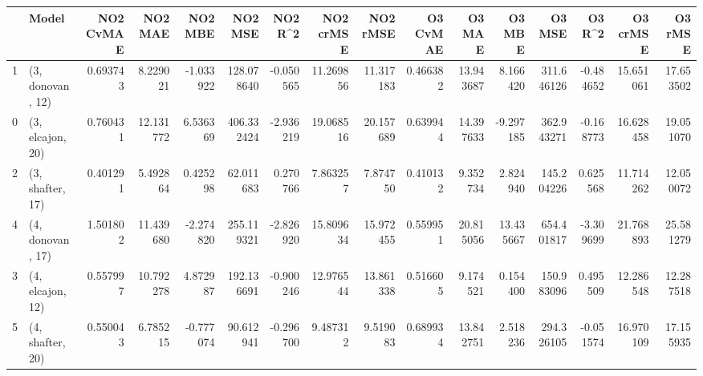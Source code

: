\begin{tabular}{llrrrrrrrrrrrrrr}
\toprule
{} &             Model &  NO2 CvMAE &    NO2 MAE &   NO2 MBE &     NO2 MSE &   NO2 R\textasciicircum2 &  NO2 crMSE &   NO2 rMSE &  O3 CvMAE &     O3 MAE &     O3 MBE &      O3 MSE &    O3 R\textasciicircum2 &   O3 crMSE &    O3 rMSE \\
\midrule
1 &  (3, donovan, 12) &   0.693743 &   8.229021 & -1.033922 &  128.078640 & -0.050565 &  11.269856 &  11.317183 &  0.466382 &  13.943687 &   8.166420 &  311.646126 & -0.484652 &  15.651061 &  17.653502 \\
0 &  (3, elcajon, 20) &   0.760431 &  12.131772 &  6.536369 &  406.332424 & -2.936219 &  19.068516 &  20.157689 &  0.639944 &  14.397633 &  -9.297185 &  362.943271 & -0.168773 &  16.628458 &  19.051070 \\
2 &  (3, shafter, 17) &   0.401291 &   5.492864 &  0.425298 &   62.011683 &  0.270766 &   7.863257 &   7.874750 &  0.410132 &   9.352734 &   2.824940 &  145.204226 &  0.625568 &  11.714262 &  12.050072 \\
4 &  (4, donovan, 17) &   1.501802 &  11.439680 & -2.274820 &  255.119321 & -2.826920 &  15.809634 &  15.972455 &  0.559951 &  20.815056 &  13.435667 &  654.401817 & -3.309699 &  21.768893 &  25.581279 \\
3 &  (4, elcajon, 12) &   0.557997 &  10.792278 &  4.872987 &  192.136691 & -0.900246 &  12.976544 &  13.861338 &  0.516605 &   9.174521 &   0.154400 &  150.983096 &  0.495509 &  12.286548 &  12.287518 \\
5 &  (4, shafter, 20) &   0.550043 &   6.785215 & -0.777074 &   90.612941 & -0.296700 &   9.487312 &   9.519083 &  0.689934 &  13.842751 &   2.518236 &  294.326105 & -0.051574 &  16.970109 &  17.155935 \\
\bottomrule
\end{tabular}

